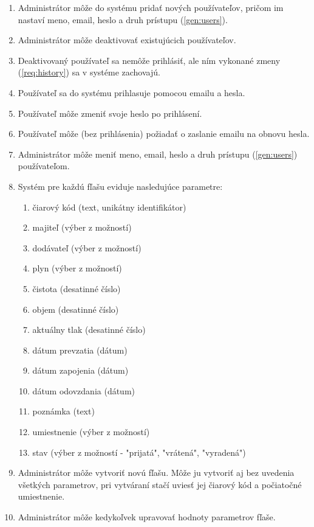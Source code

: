 \documentclass{zah}
\begin{document}
\begin{enumerate}
\item Administrátor môže do systému pridať nových používateľov, pričom im nastaví meno, email, heslo a druh prístupu (\ref{gen:users}).
\item Administrátor môže deaktivovať existujúcich používateľov.
\item Deaktivovaný používateľ sa nemôže prihlásiť, ale ním vykonané zmeny (\ref{req:history}) sa v systéme zachovajú.
\item Používateľ sa do systému prihlasuje pomocou emailu a hesla.
\item Používateľ môže zmeniť svoje heslo po prihlásení.
\item Používateľ môže (bez prihlásenia) požiadať o zaslanie emailu na obnovu hesla.
\item Administrátor môže meniť meno, email, heslo a druh prístupu (\ref{gen:users}) používateľom.
\item Systém pre každú fľašu eviduje nasledujúce parametre: 
\begin{enumerate}
	\tightlist
	\item čiarový kód (text, unikátny identifikátor)
	\item \label{req:param:owner} majiteľ (výber z možností)
	\item \label{req:param:provider} dodávateľ (výber z možností)
	\item \label{req:param:gas} plyn (výber z možností)
	\item čistota (desatinné číslo)
	\item objem (desatinné číslo)
	\item \label{req:param:pressure} aktuálny tlak (desatinné číslo)
	\item dátum prevzatia (dátum)
	\item dátum zapojenia (dátum)
	\item dátum odovzdania (dátum)
	\item poznámka (text)
	\item \label{req:param:location} umiestnenie (výber z možností)
	\item stav (výber z možností - "prijatá", "vrátená", "vyradená")
\end{enumerate}
\item Administrátor môže vytvoriť novú fľašu. Môže ju vytvoriť aj bez uvedenia všetkých parametrov, pri vytváraní stačí uviesť jej čiarový kód a počiatočné umiestnenie.
\item Administrátor môže kedykoľvek upravovať hodnoty parametrov fľaše.

\end{enumerate}
\end{document}
